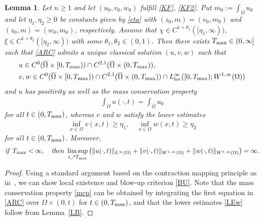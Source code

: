 \documentclass[12pt,reqno,draft]{article}
\numberwithin{equation}{section}
\theoremstyle{theorem}
\newtheorem{lem}[thm]{Lemma}
\theoremstyle{definition}
\newcommand{\cl}[1]{{\overline#1}}
\newcommand{\Tmax}{T_{\rm max}}
\begin{document}
\begin{lem} \label{LSE}
 Let $n \ge 1$ and let $(u_0, v_0, w_0)$ fulfill \eqref{KF}, \eqref{KF2}. 
Put $m_0:=\int_\Omega u_0$ and 
let $\eta_1, \eta_2\ge0$ be 
constants given by \eqref{eta} with $(z_0, m)=(v_0, m_0)$ 
and $(z_0, m)=(w_0, m_0)$, respectively. 
Assume that  
 $\chi \in C^{1+\theta_1}([\eta_1,\infty))$, 
$\xi \in C^{1+\theta_2}([\eta_2,\infty))$ 
 with some $\theta_1, \theta_2 \in (0,1)$.
 Then there exists $\Tmax \in (0,\infty]$ such that 
 \eqref{ARC} admits a unique classical solution 
 $(u, v, w)$ such that
% 
    \begin{align*}
        &u \in C^0(\cl{\Omega} \times [0,\Tmax)) 
                 \cap C^{2,1}(\cl{\Omega} \times (0,\Tmax)),
    \\
        &v,w \in C^0(\cl{\Omega} \times [0,\Tmax)) 
                 \cap C^{2,1}(\cl{\Omega} \times (0,\Tmax)) 
                 \cap L^\infty_\mathrm{loc}([0,\Tmax); W^{1,\infty}(\Omega))
    \end{align*}
 and $u$ has positivity as well as the mass conservation property
\begin{align}\label{mcp}
\int_\Omega u(\cdot, t)=\int_\Omega u_0
\end{align}
for all $t \in (0, \Tmax)$,
whereas $v$ and $w$ satisfy the lower estimates
   \begin{align}
\inf_{x \in \Omega} v(x, t) \ge \eta_1,\quad
\inf_{x \in \Omega} w(x, t) \ge \eta_2\label{LEw}
\end{align}
for all $t \in (0, \Tmax)$. 
% 
 Moreover, 
% 
    \begin{align} \label{BU}
            {\it if}\ \Tmax<\infty,
    \quad 
            {\it then}\ \limsup_{t \nearrow \Tmax} 
                           \left(\|u(\cdot,t)\|_{L^\infty(\Omega)}
                           +\|v(\cdot,t)\|_{W^{1, \infty}(\Omega)}
                           +\|w(\cdot,t)\|_{W^{1, \infty}(\Omega)}\right)=\infty.
    \end{align}
\end{lem}
\begin{proof}
 Using a standard argument based on the contraction mapping principle 
 as in~\cite[Lemma 3.1]{TW-2013}, we can show local existence and 
 blow-up criterion \eqref{BU}. 
Note that the mass conservation property \eqref{mcp} can be obtained 
 by integrating the first equation in \eqref{ARC} 
 over $\Omega \times (0, t)$ for $t\in(0, \Tmax)$, and that the lower estimates \eqref{LEw} follow from Lemma~\ref{LB}. 
\end{proof}
\end{document}
